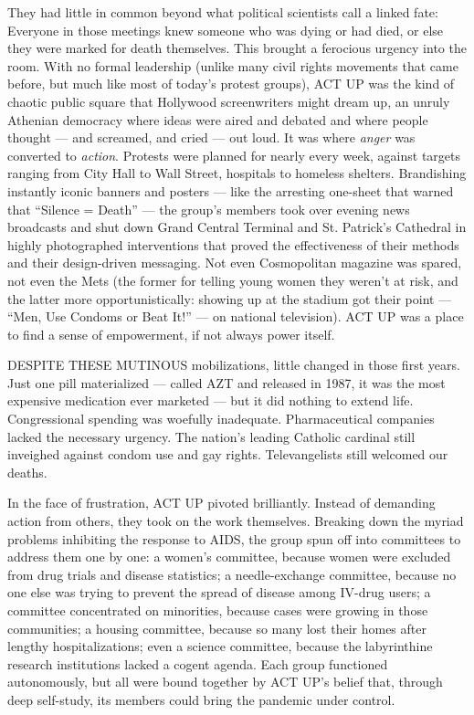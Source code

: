 They had little in common beyond what political scientists call a linked
fate: Everyone in those meetings knew someone who was dying or had died,
or else they were marked for death themselves. This brought a ferocious
urgency into the room. With no formal leadership (unlike many civil
rights movements that came before, but much like most of today's protest
groups), ACT UP was the kind of chaotic public square that Hollywood
screenwriters might dream up, an unruly Athenian democracy where ideas
were aired and debated and where people thought --- and screamed, and
cried --- out loud. It was where \emph{anger} was converted to
\emph{action}. Protests were planned for nearly every week, against
targets ranging from City Hall to Wall Street, hospitals to homeless
shelters. Brandishing instantly iconic banners and posters --- like the
arresting one-sheet that warned that ``Silence = Death'' --- the group's
members took over evening news broadcasts and shut down Grand Central
Terminal and St. Patrick's Cathedral in highly photographed
interventions that proved the effectiveness of their methods and their
design-driven messaging. Not even Cosmopolitan magazine was spared, not
even the Mets (the former for telling young women they weren't at risk,
and the latter more opportunistically: showing up at the stadium got
their point --- ``Men, Use Condoms or Beat It!'' --- on national
television). ACT UP was a place to find a sense of empowerment, if not
always power itself.

DESPITE THESE MUTINOUS mobilizations, little changed in those first
years. Just one pill materialized --- called AZT and released in 1987,
it was the most expensive medication ever marketed --- but it did
nothing to extend life. Congressional spending was woefully inadequate.
Pharmaceutical companies lacked the necessary urgency. The nation's
leading Catholic cardinal still inveighed against condom use and gay
rights. Televangelists still welcomed our deaths.

In the face of frustration, ACT UP pivoted brilliantly. Instead of
demanding action from others, they took on the work themselves. Breaking
down the myriad problems inhibiting the response to AIDS, the group spun
off into committees to address them one by one: a women's committee,
because women were excluded from drug trials and disease statistics; a
needle-exchange committee, because no one else was trying to prevent the
spread of disease among IV-drug users; a committee concentrated on
minorities, because cases were growing in those communities; a housing
committee, because so many lost their homes after lengthy
hospitalizations; even a science committee, because the labyrinthine
research institutions lacked a cogent agenda. Each group functioned
autonomously, but all were bound together by ACT UP's belief that,
through deep self-study, its members could bring the pandemic under
control.

